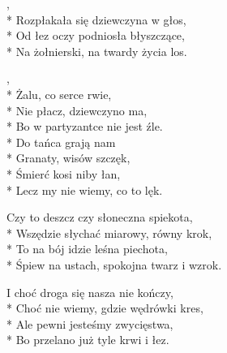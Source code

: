 
\begin{lyrics}[longestline={Śpiew na ustach, spokojna twarz i wzrok.}]

,\\*
Rozpłakała się dziewczyna w głos,\\*
Od łez oczy podniosła błyszczące,\\*
Na żołnierski, na twardy życia los.

\begin{chorus}
,\\*
Żalu, co serce rwie,\\*
Nie płacz, dziewczyno ma,\\*
Bo w partyzantce nie jest źle.\\*
Do tańca grają nam\\*
Granaty, wisów szczęk,\\*
Śmierć kosi niby łan,\\*
Lecz my nie wiemy, co to lęk.
\end{chorus}

Czy to deszcz czy słoneczna spiekota,\\*
Wszędzie słychać miarowy, równy krok,\\*
To na bój idzie leśna piechota,\\*
Śpiew na ustach, spokojna twarz i wzrok.

\chorusref

I choć droga się nasza nie kończy,\\*
Choć nie wiemy, gdzie wędrówki kres,\\*
Ale pewni jesteśmy zwycięstwa,\\*
Bo przelano już tyle krwi i łez.

\chorusref
\end{lyrics}




